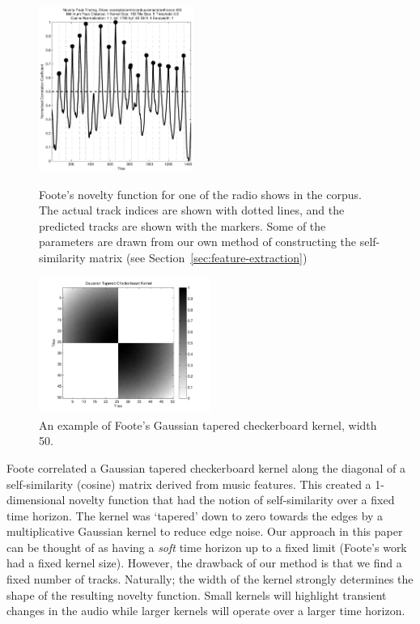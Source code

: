 \documentclass[twocolumn]{article}
\begin{document}
		\begin{figure}
			\centering
			\includegraphics[width=0.45\textwidth]{images/novelty}
			
			
			\caption{Foote's novelty function for one of the radio shows in the corpus. The actual track indices are shown with dotted lines, and the predicted tracks are shown with the markers. Some of the parameters are drawn from our own method of constructing the self-similarity matrix (see Section~\ref{sec:feature-extraction})}
			
			\bigskip
			
			\includegraphics[width=0.5\textwidth]{images/checker}
			
				\caption{An example of Foote's Gaussian tapered checkerboard kernel, width 50.}
				
			
			\label{fig:novelty}
		\end{figure} 
	
	 Foote correlated a Gaussian tapered checkerboard kernel\citep{foote2003media} along the diagonal of a self-similarity (cosine) matrix derived from music features. This created a 1-dimensional novelty function that had the notion of self-similarity over a fixed time horizon. The kernel was `tapered' down to zero towards the edges by a multiplicative Gaussian kernel to reduce edge noise. Our approach in this paper can be thought of as having a \textit{soft} time horizon up to a fixed limit (Foote's work had a fixed kernel size). However, the drawback of our method is that we find a fixed number of tracks. Naturally; the width of the kernel strongly determines the shape of the resulting novelty function. Small kernels will highlight transient changes in the audio while larger kernels will operate over a larger time horizon.  
	
\end{document}
